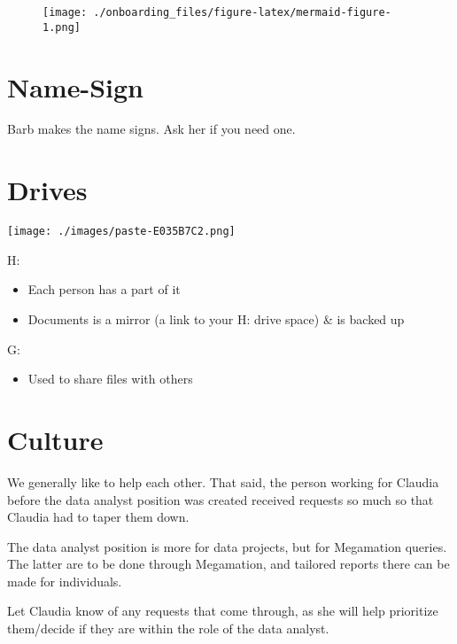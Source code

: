 \documentclass[
  letterpaper,
  DIV=11,
  numbers=noendperiod,
  oneside]{scrreprt}
\providecommand{\tightlist}{%
  \setlength{\itemsep}{0pt}\setlength{\parskip}{0pt}}\usepackage{longtable,booktabs,array}
\begin{document}
\begin{figure}[H]

{\centering \texttt{[image: ./onboarding\_files/figure-latex/mermaid-figure-1.png]}

}

\end{figure}

\hypertarget{name-sign}{%
\section{Name-Sign}\label{name-sign}}

Barb makes the name signs. Ask her if you need one.

\hypertarget{drives}{%
\section{Drives}\label{drives}}

\texttt{[image: ./images/paste-E035B7C2.png]}

H:

\begin{itemize}
\item
  Each person has a part of it
\item
  Documents is a mirror (a link to your H: drive space) \& is backed up
\end{itemize}

G:

\begin{itemize}
\tightlist
\item
  Used to share files with others
\end{itemize}

\hypertarget{culture}{%
\section{Culture}\label{culture}}

We generally like to help each other. That said, the person working for
Claudia before the data analyst position was created received requests
so much so that Claudia had to taper them down.

The data analyst position is more for data projects, but for Megamation
queries. The latter are to be done through Megamation, and tailored
reports there can be made for individuals.

Let Claudia know of any requests that come through, as she will help
prioritize them/decide if they are within the role of the data analyst.
\end{document}
